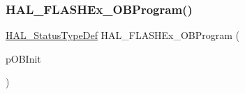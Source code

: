 \subsubsection{\texorpdfstring{H\+A\+L\+\_\+\+F\+L\+A\+S\+H\+Ex\+\_\+\+O\+B\+Program()}{HAL\_FLASHEx\_OBProgram()}}
{\footnotesize\ttfamily \hyperlink{stm32f4xx__hal__def_8h_a63c0679d1cb8b8c684fbb0632743478f}{H\+A\+L\+\_\+\+Status\+Type\+Def} H\+A\+L\+\_\+\+F\+L\+A\+S\+H\+Ex\+\_\+\+O\+B\+Program (\begin{DoxyParamCaption}\item[{\hyperlink{struct_f_l_a_s_h___o_b_program_init_type_def}{F\+L\+A\+S\+H\+\_\+\+O\+B\+Program\+Init\+Type\+Def} $\ast$}]{p\+O\+B\+Init }\end{DoxyParamCaption})}

